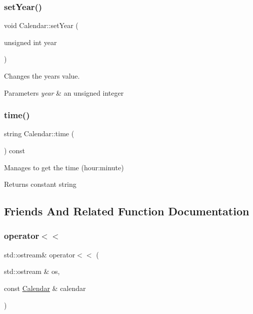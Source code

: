 \subsubsection{\texorpdfstring{set\+Year()}{setYear()}}
{\footnotesize\ttfamily void Calendar\+::set\+Year (\begin{DoxyParamCaption}\item[{unsigned int}]{year }\end{DoxyParamCaption})}



Changes the year\textquotesingle{}s value. 


\begin{DoxyParams}{Parameters}
{\em year} & an unsigned integer \\
\hline
\end{DoxyParams}
\mbox{\label{class_calendar_ae8d5a30e386a154991cf0e32f7af4b2c}} 
\subsubsection{\texorpdfstring{time()}{time()}}
{\footnotesize\ttfamily string Calendar\+::time (\begin{DoxyParamCaption}{ }\end{DoxyParamCaption}) const}



Manages to get the time (hour\+:minute) 

\begin{DoxyReturn}{Returns}
constant string 
\end{DoxyReturn}


\subsection{Friends And Related Function Documentation}
\mbox{\label{class_calendar_a4b8b43dc4ffd8338cb542043292b5231}} 
\subsubsection{\texorpdfstring{operator$<$$<$}{operator<<}}
{\footnotesize\ttfamily std\+::ostream\& operator$<$$<$ (\begin{DoxyParamCaption}\item[{std\+::ostream \&}]{os,  }\item[{const \hyperlink{class_calendar}{Calendar} \&}]{calendar }\end{DoxyParamCaption})\hspace{0.3cm}{\ttfamily [friend]}}



